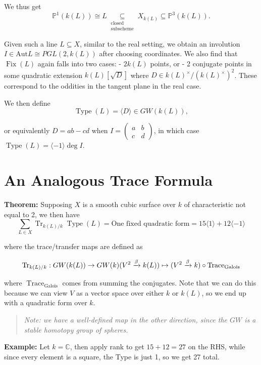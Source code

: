 \documentclass[11pt]{scrreprt}
\theoremstyle{definition}
\newcommand{\CC}[0]{{\mathbb{C}}}
\newcommand{\PP}[0]{{\mathbb{P}}}
\newcommand{\mapsvia}[1]{\xrightarrow{#1}}
\newcommand{\generators}[1]{\langle{#1}\rangle}
\newcommand{\Aut}[0]{{\text{Aut}}}
\begin{document}
We thus get \[
\PP^1(k(L)) \cong L \underset{\substack{\text{closed}\\\text{subscheme}}}\subseteq X_{k(L)} \subseteq \PP^3(k(L)).
\]

Given such a line \(L\subseteq X\), similar to the real setting, we
obtain an involution \(I \in \Aut L \cong PGL(2, k(L))\) after choosing
coordinates. We also find that \(\operatorname{Fix}(L)\) again falls into two
cases: - \(2 k(L)\) points, or - 2 conjugate points in some quadratic
extension \(k(L)[\sqrt D]\) where
\(D \in k(L)^\times / (k(L)^\times)^2\). These correspond to the
oddities in the tangent plane in the real case.

We then define \[
\operatorname{Type}(L) = \generators{D} \in GW(k(L)),
\]

or equivalently \(D=ab-cd\) when
\(I = \begin{pmatrix}a&b\\c&d\end{pmatrix}\), in which case
\(\operatorname{Type}(L) = \generators{-1}\deg I\).

\hypertarget{an-analogous-trace-formula}{%
\section{An Analogous Trace Formula}\label{an-analogous-trace-formula}}

\textbf{Theorem:} Supposing \(X\) is a smooth cubic surface over \(k\)
of characteristic not equal to 2, we then have \[
\sum_{L \in X}\operatorname{Tr}_{k(L) / k}\operatorname{Type}(L) = \text{One fixed quadratic form} = 15\generators{1} + 12\generators{-1}
\]

where the trace/transfer maps are defined as

\[
\operatorname{Tr}_{k(L) / k}: GW(k(L)) \to GW(k) \\
(V^2 \mapsvia{\beta} k(L)) \mapsto (V^2 \mapsvia{\beta} k) \circ \operatorname{Trace}_\text{Galois}
\]

where \(\operatorname{Trace}_\text{Galois}\) comes from summing the
conjugates. Note that we can do this because we can view \(V\) as a
vector space over either \(k\) or \(k(L)\), so we end up with a
quadratic form over \(k\).

\begin{quote}\textit{
Note: we have a well-defined map in the other direction, since the
\(GW\) is a stable homotopy group of spheres.
}\end{quote}

\textbf{Example:} Let \(k=\CC\), then apply rank to get \(15+12=27\) on
the RHS, while since every element is a square, the Type is just 1, so
we get 27 total.
\end{document}
